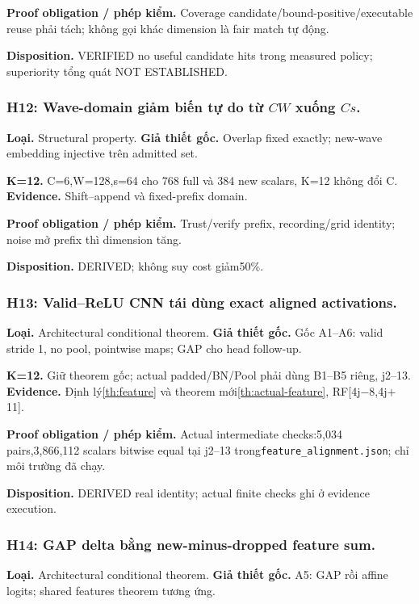 \documentclass[11pt,a4paper]{article}
\newcommand{\code}[1]{{\small\ttfamily\nolinkurl{#1}}}
\theoremstyle{remark}
\begin{document}
\textbf{Proof obligation / phép kiểm.} Coverage candidate/bound-positive/executable reuse phải tách; không gọi khác dimension là fair match tự động.

\textbf{Disposition.} VERIFIED no useful candidate hits trong measured policy; superiority tổng quát NOT ESTABLISHED.

\subsubsection*{H12: Wave-domain giảm biến tự do từ $CW$ xuống $Cs$.}
\textbf{Loại.} Structural property. \textbf{Giả thiết gốc.} Overlap fixed exactly; new-wave embedding injective trên admitted set.

\textbf{K=12.} C=6,W=128,s=64 cho 768 full và 384 new scalars, K=12 không đổi C. \textbf{Evidence.} Shift--append và fixed-prefix domain.

\textbf{Proof obligation / phép kiểm.} Trust/verify prefix, recording/grid identity; noise mở prefix thì dimension tăng.

\textbf{Disposition.} DERIVED; không suy cost giảm50\%.

\subsubsection*{H13: Valid--ReLU CNN tái dùng exact aligned activations.}
\textbf{Loại.} Architectural conditional theorem. \textbf{Giả thiết gốc.} Gốc A1--A6: valid stride 1, no pool, pointwise maps; GAP cho head follow-up.

\textbf{K=12.} Giữ theorem gốc; actual padded/BN/Pool phải dùng B1--B5 riêng, j2--13. \textbf{Evidence.} Định lý\ref{th:feature} và theorem mới\ref{th:actual-feature}, RF[4j$-$8,4j$+$11].

\textbf{Proof obligation / phép kiểm.} Actual intermediate checks:5,034 pairs,3,866,112 scalars bitwise equal tại j2--13 trong\code{feature_alignment.json}; chỉ môi trường đã chạy.

\textbf{Disposition.} DERIVED real identity; actual finite checks ghi ở evidence execution.

\subsubsection*{H14: GAP delta bằng new-minus-dropped feature sum.}
\textbf{Loại.} Architectural conditional theorem. \textbf{Giả thiết gốc.} A5: GAP rồi affine logits; shared features theorem tương ứng.
\end{document}

